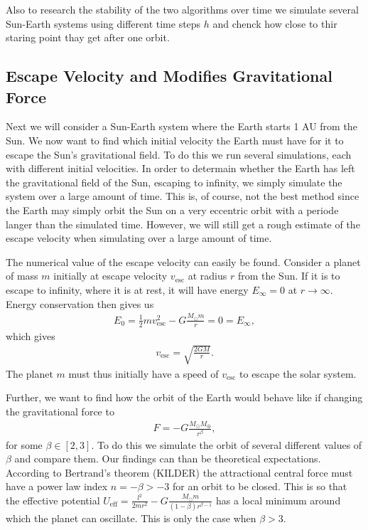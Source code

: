 \documentclass[twocolumn]{aastex62}
\begin{document}
Also to research the stability of the two algorithms over
time we simulate several Sun-Earth systems using different time steps $h$ and
chenck how close to thir staring point thay get after one orbit. 

\subsection{Escape Velocity and Modifies Gravitational Force}\label{sec:modgrav}
Next we will consider a Sun-Earth system where the Earth starts 1 AU from the
Sun. We now want to find which initial velocity the Earth must have for it to
escape the Sun's gravitational field. To do this we run several simulations,
each with different initial velocities. In order to determain whether the Earth
has left the gravitational field of the Sun, escaping to infinity, we simply
simulate the system over a large amount of time. This is, of course, not the
best method since the Earth may simply orbit the Sun on a very eccentric orbit
with a periode langer than the simulated time. However, we will still get a
rough estimate of the escape velocity when simulating over a large amount of time.

The numerical value of the escape velocity can easily be found. Consider a
planet of mass $m$ initially at escape velocity $v_\mathrm{esc}$ at radius $r$
from the Sun. If it is to escape to infinity, where it is at rest, it will have
energy $E_\infty = 0$ at $r\to\infty$. Energy conservation then gives us 
\begin{align}
    E_0 = \frac{1}{2}mv_\mathrm{esc}^2 - G\frac{M_\odot m}{r} = 0 = E_\infty,
\end{align} 
which gives 
\begin{align}\label{eq:v_esc}
    v_\mathrm{esc} = \sqrt{\frac{2GM}{r}}.
\end{align}
The planet $m$ must thus initially have a speed of $v_\mathrm{esc}$ to escape the solar system.

Further, we want to find how the orbit of the Earth would behave like if
changing the gravitational force to 
\begin{align}
    F = -G\frac{M_\odot M_\oplus}{r^\beta},
\end{align}
for some $\beta\in[2, 3]$. To do this we simulate the orbit of several different
values of $\beta$ and compare them. Our findings can than be theoretical
expectations. According to Bertrand's theorem (KILDER) the attractional central
force must have a power law index $n = -\beta > -3$ for an orbit to be closed. This is so
that the effective potential $U_\mathrm{eff} = \frac{l^2}{2mr^2} -
G\frac{M_\odot m}{(1-\beta)r^{\beta - 1}}$ has a local minimum around which the
planet can oscillate. This is only the case when $\beta > 3$.
\end{document}
